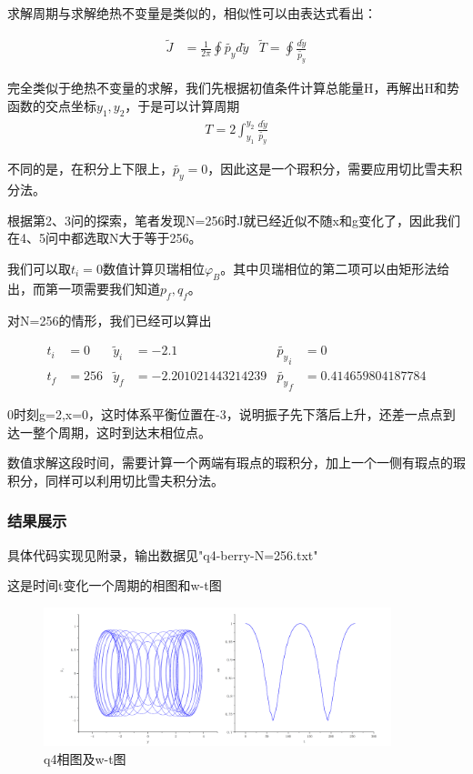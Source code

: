 \documentclass[10pt, a4paper]{article}
\newcommand{\wy}{\widetilde{y}}
\newcommand{\wpy}{\widetilde{p_y}}
\begin{document}
    求解周期与求解绝热不变量是类似的，相似性可以由表达式看出：

    \begin{align}
        \widetilde{J}&=\frac{1}{2\pi}\oint\wpy d\wy  &  \widetilde{T}=\oint\frac{d\wy}{\wpy}
    \end{align}

    完全类似于绝热不变量的求解，我们先根据初值条件计算总能量H，再解出H和势函数的交点坐标$y_1,y_2$，于是可以计算周期
    \begin{align}
        T=2\int_{y_1}^{y_2}\frac{d\wy}{\wpy}
    \end{align}

    不同的是，在积分上下限上，$\wpy=0$，因此这是一个瑕积分，需要应用切比雪夫积分法。

    根据第2、3问的探索，笔者发现N=256时J就已经近似不随x和g变化了，因此我们在4、5问中都选取N大于等于256。

    我们可以取$t_i=0$数值计算贝瑞相位$\varphi_B$。其中贝瑞相位的第二项可以由矩形法给出，而第一项需要我们知道$p_f,q_f$。

    对N=256的情形，我们已经可以算出

    \begin{align}
        t_i&=0& \wy_i&=-2.1& \wpy_i&=0\\
        t_f&=256& \wy_f&=-2.201021443214239& \wpy_f&=0.414659804187784
    \end{align}

    0时刻g=2,x=0，这时体系平衡位置在-3，说明振子先下落后上升，还差一点点到达一整个周期，这时到达末相位点。

    数值求解这段时间，需要计算一个两端有瑕点的瑕积分，加上一个一侧有瑕点的瑕积分，同样可以利用切比雪夫积分法。

    \subsubsection{结果展示}

    具体代码实现见附录，输出数据见"q4-berry-N=256.txt"

    这是时间t变化一个周期的相图和w-t图

    \begin{figure}[H]
        \centering
        \includegraphics[width=0.9\textwidth]{q4相图及w-t图.jpg}
        \caption{q4相图及w-t图}\label{q4相图及w-t图}
    \end{figure}
\end{document}
